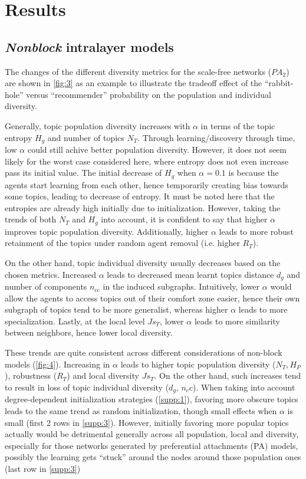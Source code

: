 \section{Results}

\subsection{\textit{Nonblock} intralayer models}




The changes of the different diversity metrics for the scale-free networks ($PA_2$) are shown in \autoref{fig:3} as an example to illustrate the tradeoff effect of the ``rabbit-hole'' versus ``recommender'' probability on the population and individual diversity.

Generally, topic population diversity increases with $\alpha$ in terms of the topic entropy $H_g$ and number of topics $N_T$. Through learning/discovery through time, low $\alpha$ could still achive better population diversity. However, it does not seem likely for the worst case considered here, where entropy does not even increase pass its initial value. The initial decrease of $H_g$ when $\alpha = 0.1$ is because the agents start learning from each other, hence temporarily creating bias towards some topics, leading to decrease of entropy. It must be noted here that the entropies are already high initially due to initialization. However, taking the trends of both $N_T$ and $H_g$ into account, it is confident to say that higher $\alpha$ improves topic population diversity. Additionally, higher $\alpha$ leads to more robust retainment of the topics under random agent removal (i.e. higher $R_T$).

On the other hand, topic individual diversity usually decreases based on the chosen metrics. Increased $\alpha$ leads to decreased mean learnt topics distance $d_g$ and number of components $n_{\mathrm{cc}}$ in the induced subgraphs. Intuitively, lower $\alpha$ would allow the agents to access topics out of their comfort zone easier, hence their own subgraph of topics tend to be more generalist, whereas higher $\alpha$ leads to more specialization. Lastly, at the local level $Js_T$, lower $\alpha$ leads to more similarity between neighbors, hence lower local diversity.

These trends are quite consistent across different considerations of non-block models (\autoref{fig:4}). Increasing in $\alpha$ leads to higher topic population diversity ($N_T, H_P$), robustness ($R_T$) and local diversity $Js_T$. On the other hand, such increases tend to result in loss of topic individual diversity ($d_g$, $n_cc$). When taking into account degree-dependent initialization strategies (\autoref{supp:1}), favoring more obscure topics leads to the same trend as random initialization, though small effects when $\alpha$ is small (first 2 rows in \autoref{supp:3}). However, initially favoring more popular topics actually would be detrimental generally across all population, local and diversity, especially for those networks generated by preferential attachments (PA) models, possibly the learning gets ``stuck'' around the nodes around those population ones (last row in \autoref{supp:3})

